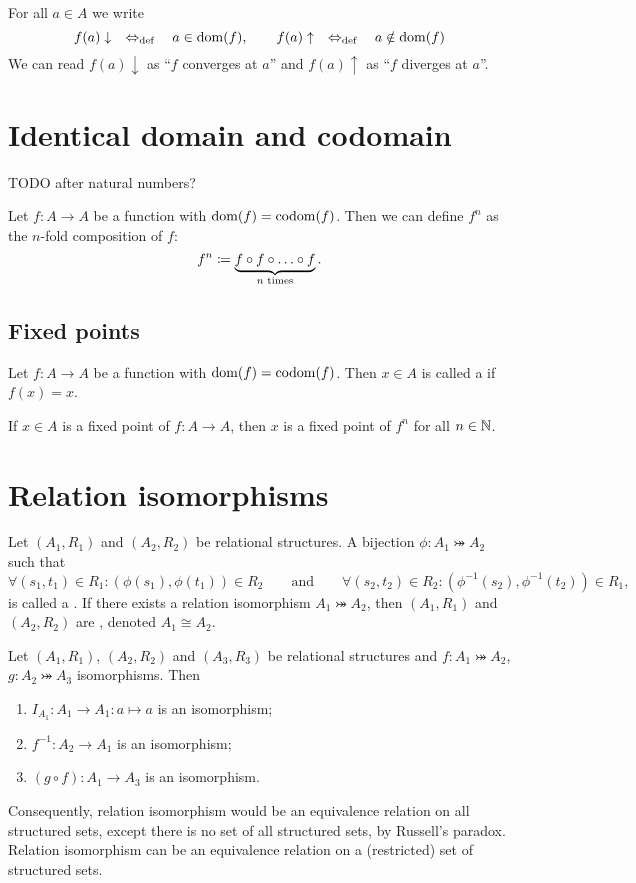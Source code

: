 For all $a\in A$ we write
\[ f(a)\downarrow \quad\Leftrightarrow_{\text{def}}\quad a\in\operatorname{dom}(f),\qquad f(a)\uparrow \quad\Leftrightarrow_{\text{def}}\quad a\notin\operatorname{dom}(f) \]
We can read $f(a)\downarrow$ as ``$f$ converges at $a$'' and $f(a)\uparrow$ as ``$f$ diverges at $a$''.

\section{Identical domain and codomain}
TODO after natural numbers?

Let $f: A\to A$ be a function with $\operatorname{dom}(f) = \operatorname{codom}(f)$. Then we can define $f^n$ as the $n$-fold composition of $f$:
\[ f^n \coloneqq \underbrace{f\circ f \circ \ldots \circ f}_{\text{$n$ times}}. \]

\subsection{Fixed points}
\begin{definition}
Let $f: A\to A$ be a function with $\operatorname{dom}(f) = \operatorname{codom}(f)$. Then $x\in A$ is called a  if $f(x) = x$. 
\end{definition}

\begin{lemma} \label{lemma:fixedPointsMultipleComposition}
If $x\in A$ is a fixed point of $f:A\to A$, then $x$ is a fixed point of $f^n$ for all $n\in \mathbb{N}$.
\end{lemma}


\section{Relation isomorphisms}
\begin{definition}
Let $(A_1, R_1)$ and $(A_2, R_2)$ be relational structures. A bijection $\phi:A_1 \twoheadrightarrowtail A_2$ such that
\[ \forall (s_1,t_1)\in R_1: (\phi(s_1),\phi(t_1))\in R_2 \qquad \text{and} \qquad \forall (s_2,t_2)\in R_2: (\phi^{-1}(s_2),\phi^{-1}(t_2))\in R_1, \]
is called a . If there exists a relation isomorphism $A_1 \twoheadrightarrowtail A_2$, then $(A_1, R_1)$ and $(A_2, R_2)$ are , denoted $A_1 \cong A_2$.
\end{definition}

\begin{lemma} \label{lemma:isomorphismEquivalence}
Let $(A_1, R_1)$, $(A_2, R_2)$ and $(A_3, R_3)$ be relational structures and $f:A_1 \twoheadrightarrowtail A_2$, $g:A_2 \twoheadrightarrowtail A_3$ isomorphisms. Then
\begin{enumerate}
\item $I_{A_1}: A_1 \to A_1: a\mapsto a$ is an isomorphism;
\item $f^{-1}: A_2\to A_1$ is an isomorphism;
\item $(g\circ f): A_1\to A_3$ is an isomorphism.
\end{enumerate}
\end{lemma}
Consequently, relation isomorphism would be an equivalence relation on all structured sets, except there is no set of all structured sets, by Russell's paradox. Relation isomorphism can be an equivalence relation on a (restricted) set of structured sets.

